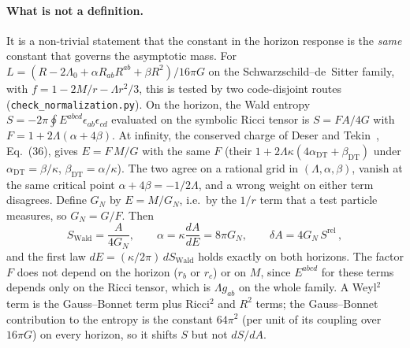 \documentclass[11pt]{article}
\newcommand{\Srel}{S^{\mathrm{rel}}}
\begin{document}
\paragraph{What is not a definition.} It is a non-trivial statement that the constant in the horizon response is the \emph{same} constant that governs the asymptotic mass. For $L=(R-2\Lambda_0+\alpha R_{ab}R^{ab}+\beta R^2)/16\pi G$ on the Schwarzschild--de~Sitter family, with $f=1-2M/r-\Lambda r^2/3$, this is tested by two code-disjoint routes (\texttt{check\_normalization.py}). On the horizon, the Wald entropy $S=-2\pi\oint E^{abcd}\epsilon_{ab}\epsilon_{cd}$ evaluated on the symbolic Ricci tensor is $S=F A/4G$ with $F=1+2\Lambda(\alpha+4\beta)$. At infinity, the conserved charge of Deser and Tekin~\cite{DeserTekin2003}, Eq.~(36), gives $E=F\,M/G$ with the same $F$ (their $1+2\Lambda\kappa(4\alpha_{\mathrm{DT}}+\beta_{\mathrm{DT}})$ under $\alpha_{\mathrm{DT}}=\beta/\kappa$, $\beta_{\mathrm{DT}}=\alpha/\kappa$). The two agree on a rational grid in $(\Lambda,\alpha,\beta)$, vanish at the same critical point $\alpha+4\beta=-1/2\Lambda$, and a wrong weight on either term disagrees. Define $G_N$ by $E=M/G_N$, i.e.\ by the $1/r$ term that a test particle measures, so $G_N=G/F$. Then
\begin{equation}
S_{\mathrm{Wald}}=\frac{A}{4G_N},\qquad \alpha=\kappa\frac{dA}{dE}=8\pi G_N,\qquad \delta A=4G_N\,\Srel\,,
\label{eq:GN}
\end{equation}
and the first law $dE=(\kappa/2\pi)\,dS_{\mathrm{Wald}}$ holds exactly on both horizons. The factor $F$ does not depend on the horizon ($r_b$ or $r_c$) or on $M$, since $E^{abcd}$ for these terms depends only on the Ricci tensor, which is $\Lambda g_{ab}$ on the whole family. A Weyl$^2$ term is the Gauss--Bonnet term plus Ricci$^2$ and $R^2$ terms; the Gauss--Bonnet contribution to the entropy is the constant $64\pi^2$ (per unit of its coupling over $16\pi G$) on every horizon, so it shifts $S$ but not $dS/dA$.
\end{document}
